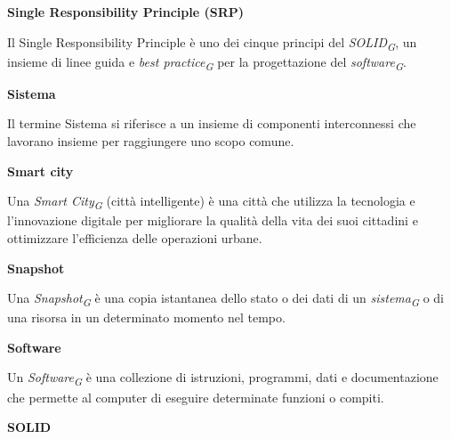 \documentclass{article}
\begin{document}
\textbf{Single Responsibility Principle (SRP)}

\vspace{0.1cm}

Il Single Responsibility Principle è uno dei cinque principi del \textit{SOLID}\textsubscript{\textit{G}}, un insieme di linee guida e \textit{best practice}\textsubscript{\textit{G}} per la progettazione del \textit{software}\textsubscript{\textit{G}}.

\vspace{0.4cm}

\textbf{Sistema}

\vspace{0.1cm}

Il termine Sistema si riferisce a un insieme di componenti interconnessi che lavorano insieme per raggiungere uno scopo comune.

\vspace{0.4cm}

\textbf{Smart city}

\vspace{0.1cm}

Una \textit{Smart City}\textsubscript{\textit{G}} (città intelligente) è una città che utilizza la tecnologia e l'innovazione digitale per migliorare la qualità della vita dei suoi cittadini e ottimizzare l'efficienza delle operazioni urbane.

\vspace{0.4cm}

\textbf{Snapshot}

\vspace{0.1cm}

Una \textit{Snapshot}\textsubscript{\textit{G}} è una copia istantanea dello stato o dei dati di un \textit{sistema}\textsubscript{\textit{G}} o di una risorsa in un determinato momento nel tempo. 

\vspace{0.4cm}

\textbf{Software}

\vspace{0.1cm}

Un \textit{Software}\textsubscript{\textit{G}} è una collezione di istruzioni, programmi, dati e documentazione che permette al computer di eseguire determinate funzioni o compiti.

\vspace{0.4cm}

\textbf{SOLID}

\vspace{0.1cm}
\end{document}
